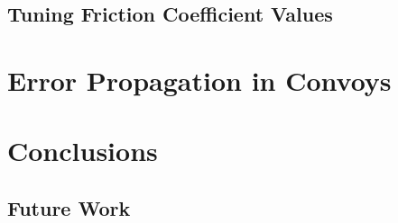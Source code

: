 \documentclass[12pt]{report}
\begin{document}
\section{Tuning Friction Coefficient Values}
\label{sec:tunemu}


\chapter{Error Propagation in Convoys}
\label{chap:errprop}




\chapter{Conclusions}
\label{chap:concl}


\section{Future Work}
\label{sec:futwork}





\nocite{travisdiss}
\nocite{travisshort}
\nocite{calgary}

\end{document}
